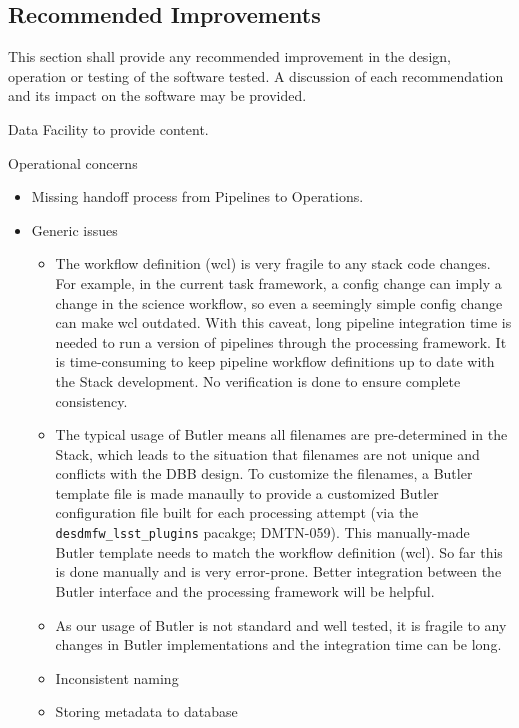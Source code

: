 \documentclass[DM,lsstdraft,STR,toc]{lsstdoc}
\begin{document}
\subsection{Recommended Improvements \label{sect:recommendations}}
This section shall provide any recommended improvement in the design, operation or testing of the software tested. A discussion
of each recommendation and its impact on the software may be provided.

\begin{note}
Data Facility to provide content.
\end{note}

Operational concerns
\begin{itemize}
  \item Missing handoff process from Pipelines to Operations.
  \item Generic issues
  \begin{itemize}
    \item The workflow definition (wcl) is very fragile to any stack
	  code changes. For example, in the current task framework,
	  a config change can imply a change in the science workflow,
	  so even a seemingly simple config change can make wcl
	  outdated. With this caveat, long pipeline integration
	  time is needed to run a version of pipelines through the
	  processing framework. It is time-consuming to keep pipeline
	  workflow definitions up to date with the Stack development.
          No verification is done to ensure complete consistency.
    \item The typical usage of Butler means all filenames are
	  pre-determined in the Stack, which leads to the situation
	  that filenames are not unique and conflicts with the DBB
	  design. To customize the filenames, a Butler template
	  file is made manaully to provide a customized Butler
	  configuration file built for each processing attempt (via
	  the \texttt{desdmfw{\_}lsst{\_}plugins} pacakge; DMTN-059).
	  This manually-made Butler template needs to match the
	  workflow definition (wcl). So far this is done manually
	  and is very error-prone.  Better integration between the
	  Butler interface and the processing framework will be helpful.
    \item As our usage of Butler is not standard and well tested,
	  it is fragile to any changes in Butler implementations
	  and the integration time can be long.
    \item Inconsistent naming
    \item Storing metadata to database

\end{itemize}
\end{itemize}
\end{document}
